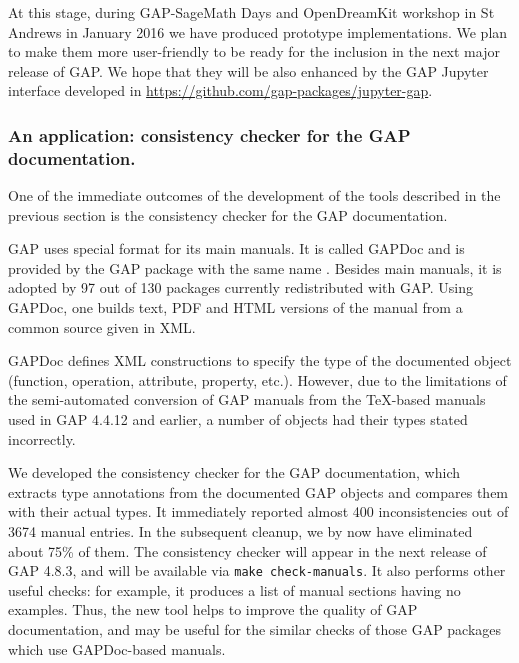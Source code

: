 At this stage, during GAP-SageMath Days and OpenDreamKit workshop in St Andrews 
in January 2016 we have produced prototype implementations. We plan to make them
more user-friendly to be ready for the inclusion in the next major release of GAP. 
We hope that they will be also enhanced by the GAP Jupyter interface developed in 
\url{https://github.com/gap-packages/jupyter-gap}.


\subsubsection{An application: consistency checker for the GAP documentation.}\label{gap-types}

One of the immediate outcomes of the development of the tools described in the
previous section is the consistency checker for the GAP documentation. 

GAP uses special format for its main manuals. It is called GAPDoc and is 
provided by the GAP package with the same name \cite{gapdoc}. Besides main 
manuals, it is adopted by 97 out of 130 packages currently redistributed 
with GAP. Using GAPDoc, one builds text, PDF and HTML versions of the manual
from a common source given in XML.

GAPDoc defines XML constructions to specify the type of the documented object 
(function, operation, attribute, property, etc.). However, due to the 
limitations of the semi-automated conversion of GAP manuals from the \TeX-based
manuals used in GAP 4.4.12 and earlier, a number of objects had their types
stated incorrectly. 

We developed the consistency checker for the GAP documentation, which extracts
type annotations from the documented GAP objects and compares them with their
actual types. It immediately reported almost 400 inconsistencies out of 3674 
manual entries. In the subsequent cleanup, we by now have eliminated about 
75\% of them. The  consistency checker will appear in the next release of
GAP 4.8.3, and will be available via \texttt{make check-manuals}.
It also performs other useful checks: for example, it produces a list of
manual sections having no examples. Thus, the new tool helps to improve
the quality of GAP documentation, and may be useful for the similar checks
of those GAP packages which use GAPDoc-based manuals.


